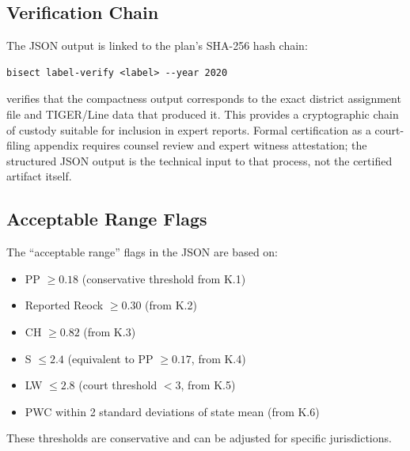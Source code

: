 \subsection{Verification Chain}

The JSON output is linked to the plan's SHA-256 hash chain:
\begin{verbatim}
bisect label-verify <label> --year 2020
\end{verbatim}
verifies that the compactness output corresponds to the exact district
assignment file and TIGER/Line data that produced it.
This provides a cryptographic chain of custody suitable for inclusion in expert reports.
Formal certification as a court-filing appendix requires counsel review and
expert witness attestation; the structured JSON output is the technical input
to that process, not the certified artifact itself.

\subsection{Acceptable Range Flags}

The ``acceptable range'' flags in the JSON are based on:
\begin{itemize}
  \item PP $\geq 0.18$ (conservative threshold from K.1)
  \item Reported Reock $\geq 0.30$ (from K.2)
  \item CH $\geq 0.82$ (from K.3)
  \item S $\leq 2.4$ (equivalent to PP $\geq 0.17$, from K.4)
  \item LW $\leq 2.8$ (court threshold $< 3$, from K.5)
  \item PWC within 2 standard deviations of state mean (from K.6)
\end{itemize}
These thresholds are conservative and can be adjusted for specific jurisdictions.
